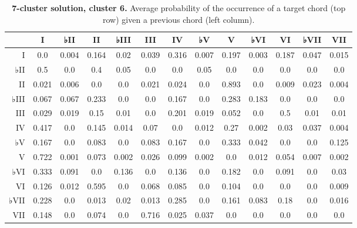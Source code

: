 \begin{table}[htbp]
\begin{minipage}{\linewidth}
\setlength{\tymax}{0.5\linewidth}
\centering
\small
\caption{\textbf{7-cluster solution, cluster 6.} Average probability of the occurrence of a target chord (top row) given a previous chord (left column).}
\label{7-clustersolutioncluster6.averageprobabilityoftheoccurrenceofatargetchordtoprowgivenapreviouschordleftcolumn.}
\begin{tabulary}{\textwidth}{@{}RCCCCCCCCCCCC@{}} \toprule
&I&♭II&II&♭III&III&IV&♭V&V&♭VI&VI&♭VII&VII\\
\midrule
I&0.0&0.004&0.164&0.02&0.039&0.316&0.007&0.197&0.003&0.187&0.047&0.015\\
♭II&0.5&0.0&0.4&0.05&0.0&0.0&0.05&0.0&0.0&0.0&0.0&0.0\\
II&0.021&0.006&0.0&0.0&0.021&0.024&0.0&0.893&0.0&0.009&0.023&0.004\\
♭III&0.067&0.067&0.233&0.0&0.0&0.167&0.0&0.283&0.183&0.0&0.0&0.0\\
III&0.029&0.019&0.15&0.01&0.0&0.201&0.019&0.052&0.0&0.5&0.01&0.01\\
IV&0.417&0.0&0.145&0.014&0.07&0.0&0.012&0.27&0.002&0.03&0.037&0.004\\
♭V&0.167&0.0&0.083&0.0&0.083&0.167&0.0&0.333&0.042&0.0&0.0&0.125\\
V&0.722&0.001&0.073&0.002&0.026&0.099&0.002&0.0&0.012&0.054&0.007&0.002\\
♭VI&0.333&0.091&0.0&0.136&0.0&0.136&0.0&0.182&0.0&0.091&0.0&0.03\\
VI&0.126&0.012&0.595&0.0&0.068&0.085&0.0&0.104&0.0&0.0&0.0&0.009\\
♭VII&0.228&0.0&0.013&0.02&0.013&0.285&0.0&0.161&0.083&0.18&0.0&0.016\\
VII&0.148&0.0&0.074&0.0&0.716&0.025&0.037&0.0&0.0&0.0&0.0&0.0\\

\bottomrule

\end{tabulary}
\end{minipage}
\end{table}

